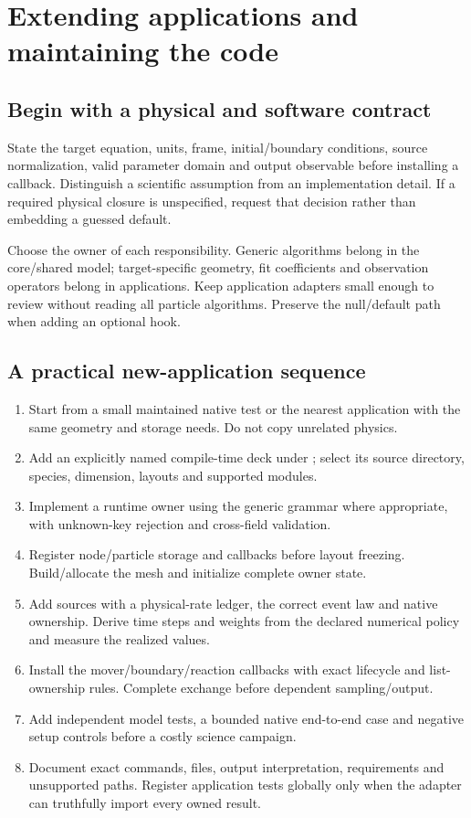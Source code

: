 \chapter{Extending applications and maintaining the code}\label{ch:development}
\section{Begin with a physical and software contract}
State the target equation, units, frame, initial/boundary conditions, source
normalization, valid parameter domain and output observable before installing
a callback. Distinguish a scientific assumption from an implementation detail.
If a required physical closure is unspecified, request that decision rather
than embedding a guessed default.

Choose the owner of each responsibility. Generic algorithms belong in the
core/shared model; target-specific geometry, fit coefficients and observation
operators belong in applications. Keep application adapters small enough to
review without reading all particle algorithms. Preserve the null/default
path when adding an optional hook.

\section{A practical new-application sequence}
\begin{enumerate}
\item Start from a small maintained native test or the nearest application
with the same geometry and storage needs. Do not copy unrelated physics.
\item Add an explicitly named compile-time deck under ; select
its source directory, species, dimension, layouts and supported modules.
\item Implement a runtime owner using the generic grammar where appropriate,
with unknown-key rejection and cross-field validation.
\item Register node/particle storage and callbacks before layout freezing.
Build/allocate the mesh and initialize complete owner state.
\item Add sources with a physical-rate ledger, the correct event law and
native ownership. Derive time steps and weights from the declared numerical
policy and measure the realized values.
\item Install the mover/boundary/reaction callbacks with exact lifecycle and
list-ownership rules. Complete exchange before dependent sampling/output.
\item Add independent model tests, a bounded native end-to-end case and
negative setup controls before a costly science campaign.
\item Document exact commands, files, output interpretation, requirements
and unsupported paths. Register application tests globally only when the
adapter can truthfully import every owned result.
\end{enumerate}

